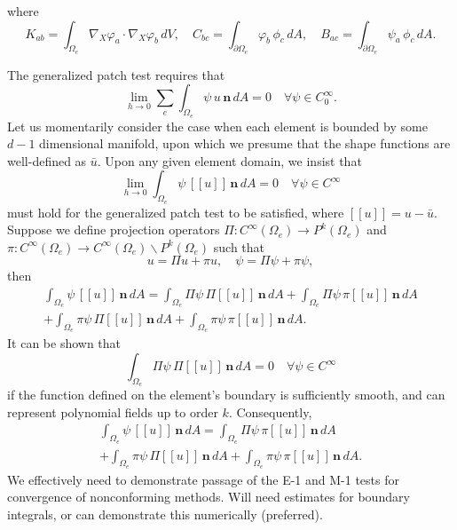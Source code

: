 where
\begin{equation}
	K_{ab} = \int_{\Omega_e} \nabla_X \varphi_a \cdot \nabla_X \varphi_b \, dV, \quad C_{bc} = \int_{\partial \Omega_e} \varphi_b \, \phi_c \, dA, \quad B_{ac} = \int_{\partial \Omega_e} \psi_a \, \phi_c \, dA.
\end{equation}

The generalized patch test requires that
\begin{equation}
	\lim_{h \rightarrow 0} \sum_e \int_{\Omega_e} \psi \, u \, \mathbf{n} \, dA = 0 \quad \forall \psi \in C^\infty_0.
\end{equation}
Let us momentarily consider the case when each element is bounded by some $d-1$ dimensional manifold, upon which we presume that the shape functions are well-defined as $\bar{u}$. Upon any given element domain, we insist that
\begin{equation}
	\lim_{h \rightarrow 0} \int_{\Omega_e} \psi \, [\![ u ]\!] \, \mathbf{n} \, dA = 0 \quad \forall \psi \in C^\infty
\end{equation}
must hold for the generalized patch test to be satisfied, where $[\![ u ]\!] = u - \bar{u}$. Suppose we define projection operators $\Pi : C^\infty(\Omega_e) \rightarrow P^k (\Omega_e)$ and $\pi : C^\infty(\Omega_e) \rightarrow C^\infty(\Omega_e) \backslash P^k (\Omega_e)$ such that
\begin{equation}
	u = \Pi u + \pi u, \quad \psi = \Pi \psi + \pi \psi,
\end{equation}
then
\begin{eqnarray}
	\int_{\Omega_e} \psi \, [\![ u ]\!] \, \mathbf{n} \, dA = \int_{\Omega_e} \Pi \psi \, \Pi [\![ u ]\!] \, \mathbf{n} \, dA + \int_{\Omega_e} \Pi \psi \, \pi [\![ u ]\!] \, \mathbf{n} \, dA \\ + \int_{\Omega_e} \pi \psi \, \Pi [\![ u ]\!] \, \mathbf{n} \, dA +
\int_{\Omega_e} \pi \psi \, \pi [\![ u ]\!] \, \mathbf{n} \, dA.
\end{eqnarray}
It can be shown that
\begin{equation}
	\int_{\Omega_e} \Pi \psi \, \Pi [\![ u ]\!] \, \mathbf{n} \, dA = 0 \quad \forall \psi \in C^\infty
\end{equation}
if the function defined on the element's boundary is sufficiently smooth, and can represent polynomial fields up to order $k$. Consequently,
\begin{eqnarray}
	\int_{\Omega_e} \psi \, [\![ u ]\!] \, \mathbf{n} \, dA = \int_{\Omega_e} \Pi \psi \, \pi [\![ u ]\!] \, \mathbf{n} \, dA \\ + \int_{\Omega_e} \pi \psi \, \Pi [\![ u ]\!] \, \mathbf{n} \, dA +
\int_{\Omega_e} \pi \psi \, \pi [\![ u ]\!] \, \mathbf{n} \, dA.
\end{eqnarray}
We effectively need to demonstrate passage of the E-1 and M-1 tests for convergence of nonconforming methods. Will need estimates for boundary integrals, or can demonstrate this numerically (preferred).

